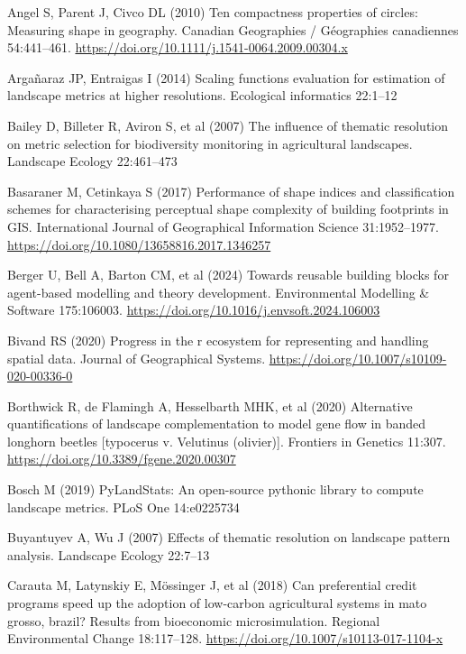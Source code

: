 \documentclass[
  10pt,
  a4paperpaper,
]{article}
\newlength{\cslhangindent}
\newenvironment{CSLReferences}[2] %
 {\begin{list}{}{%
  \setlength{\itemindent}{0pt}
  \setlength{\leftmargin}{0pt}
  \setlength{\parsep}{0pt}
  \ifodd #1
   \setlength{\leftmargin}{\cslhangindent}
   \setlength{\itemindent}{-1\cslhangindent}
  \fi
  \setlength{\itemsep}{#2\baselineskip}}}
 {\end{list}}
\begin{document}
\label{refs}
\begin{CSLReferences}{1}{1}
Angel S, Parent J, Civco DL (2010) Ten compactness properties of
circles: Measuring shape in geography. Canadian Geographies /
G{é}ographies canadiennes 54:441--461.
\url{https://doi.org/10.1111/j.1541-0064.2009.00304.x}

Argañaraz JP, Entraigas I (2014) Scaling functions evaluation for
estimation of landscape metrics at higher resolutions. Ecological
informatics 22:1--12

Bailey D, Billeter R, Aviron S, et al (2007) The influence of thematic
resolution on metric selection for biodiversity monitoring in
agricultural landscapes. Landscape Ecology 22:461--473

Basaraner M, Cetinkaya S (2017) Performance of shape indices and
classification schemes for characterising perceptual shape complexity of
building footprints in GIS. International Journal of Geographical
Information Science 31:1952--1977.
\url{https://doi.org/10.1080/13658816.2017.1346257}

Berger U, Bell A, Barton CM, et al (2024) Towards reusable building
blocks for agent-based modelling and theory development. Environmental
Modelling \& Software 175:106003.
\url{https://doi.org/10.1016/j.envsoft.2024.106003}

Bivand RS (2020) Progress in the r ecosystem for representing and
handling spatial data. Journal of Geographical Systems.
\url{https://doi.org/10.1007/s10109-020-00336-0}

Borthwick R, de Flamingh A, Hesselbarth MHK, et al (2020) Alternative
quantifications of landscape complementation to model gene flow in
banded longhorn beetles {[}typocerus v. Velutinus (olivier){]}.
Frontiers in Genetics 11:307.
\url{https://doi.org/10.3389/fgene.2020.00307}

Bosch M (2019) PyLandStats: An open-source pythonic library to compute
landscape metrics. PLoS One 14:e0225734

Buyantuyev A, Wu J (2007) Effects of thematic resolution on landscape
pattern analysis. Landscape Ecology 22:7--13

Carauta M, Latynskiy E, Mössinger J, et al (2018) Can preferential
credit programs speed up the adoption of low-carbon agricultural systems
in mato grosso, brazil? Results from bioeconomic microsimulation.
Regional Environmental Change 18:117--128.
\url{https://doi.org/10.1007/s10113-017-1104-x}


\end{CSLReferences}
\end{document}
